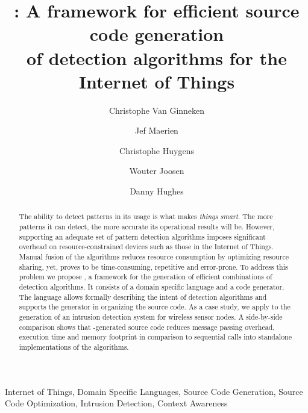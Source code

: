 \documentclass[3p,times,procedia]{elsarticle}
\begin{document}
\begin{frontmatter}


\title{
\FOO: A framework for efficient source code generation\\
of detection algorithms for the Internet of Things
}

\author{Christophe Van Ginneken}
\author{Jef Maerien}
\author{Christophe Huygens}
\author{Wouter Joosen}
\author{Danny Hughes}

\address{
iMinds-DistriNet, KU Leuven, 3001 Leuven, Belgium\\
\{firstname.lastname\}@cs.kuleuven.be
}

\begin{abstract}

The ability to detect patterns in its usage is what makes \emph{things}
\emph{smart}. The more patterns it can detect, the more accurate its
operational results will be. However, supporting an adequate set of pattern
detection algorithms imposes significant overhead on resource-constrained
devices such as those in the Internet of Things. Manual fusion of the
algorithms reduces resource consumption by optimizing resource sharing, yet,
proves to be time-consuming, repetitive and error-prone. To address this
problem we propose \FOO, a framework for the generation of efficient
combinations of detection algorithms. It consists of a domain specific language
and a code generator. The language allows formally describing the intent of
detection algorithms and supports the generator in organizing the source code.
As a case study, we apply \FOO to the generation of an intrusion detection
system for wireless sensor nodes. A side-by-side comparison shows that
\FOO-generated source code reduces message passing overhead, execution time and
memory footprint in comparison to sequential calls into standalone
implementations of the algorithms.

\end{abstract}

\begin{keyword}

Internet of Things, Domain Specific Languages, Source Code Generation, Source
Code Optimization, Intrusion Detection, Context Awareness

\end{keyword}

\end{frontmatter}
\end{document}
